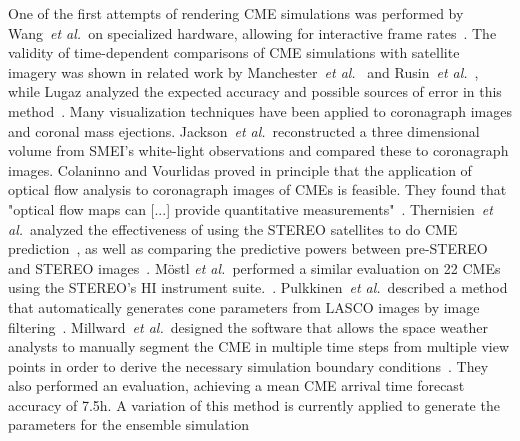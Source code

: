 \documentclass[journal]{vgtc}                %
\def\etal{\textit{et al.}}
\begin{document}
 One of the first attempts of rendering CME simulations was performed by Wang~\etal\ on specialized hardware, allowing for interactive frame rates~\cite{wang2004visualization}. The validity of time-dependent comparisons of CME simulations with satellite imagery was shown in related work by Manchester~\etal ~\cite{manchester2008three} and Rusin~\etal ~\cite{rusin2010comparing}, while Lugaz analyzed the expected accuracy and possible sources of error in this method~\cite{lugaz2010accuracy}. Many visualization techniques have been applied to coronagraph images and coronal mass ejections. Jackson~\etal\ reconstructed a three dimensional volume from SMEI's white-light observations and compared these to coronagraph images. Colaninno and Vourlidas proved in principle that the application of optical flow analysis to coronagraph images of CMEs is feasible. They found that "optical flow maps can [...] provide quantitative measurements"~\cite{Colaninno:2006ef}. Thernisien~\etal\ analyzed the effectiveness of using the STEREO satellites to do CME prediction~\cite{Thernisien:2009hx}, as well as comparing the predictive powers between pre-STEREO and STEREO images~\cite{Thernisien:2011fl}. M\"ostl \etal\ performed a similar evaluation on 22 CMEs using the STEREO's HI instrument suite.~\cite{Mostl:2014iv}. Pulkkinen~\etal\ described a method that automatically generates cone parameters from LASCO images by image filtering~\cite{Pulkkinen:2009gb}. Millward~\etal\ designed the software that allows the space weather analysts to manually segment the CME in multiple time steps from multiple view points in order to derive the necessary simulation boundary conditions~\cite{Millward:2013cm}. They also performed an evaluation, achieving a mean CME arrival time forecast accuracy of 7.5h. A variation of this method is currently applied to generate the parameters for the ensemble simulation



\end{document}
